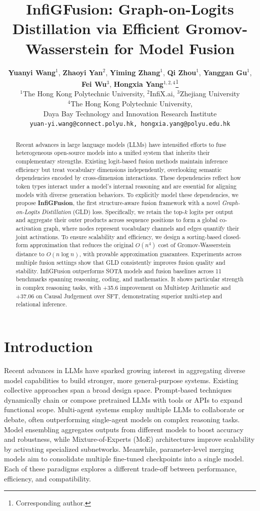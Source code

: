 \documentclass{article}
\title{InfiGFusion: Graph-on-Logits Distillation via Efficient Gromov-Wasserstein for Model Fusion}
\author{%
\textbf{Yuanyi Wang}$^{1}$,
\textbf{Zhaoyi Yan}$^{2}$,
\textbf{Yiming Zhang}$^{1}$,
\textbf{Qi Zhou}$^{1}$,
\textbf{Yanggan Gu}$^{1}$,\\
\textbf{Fei Wu}$^{3}$,
\textbf{Hongxia Yang}$^{1,2,4}$\thanks{Corresponding author.} \\
$^{1}$The Hong Kong Polytechnic University,
$^{2}$InfiX.ai, 
$^{3}$Zhejiang University \\
$^{4}$The Hong Kong Polytechnic University, \\Daya Bay Technology and Innovation Research Institute \\
\texttt{yuan-yi.wang@connect.polyu.hk, hongxia.yang@polyu.edu.hk} \\
}
\begin{document}
\maketitle


\begin{abstract}
Recent advances in large language models (LLMs) have intensified efforts to fuse heterogeneous open-source models into a unified system that inherits their complementary strengths. 
%
Existing logit-based fusion methods maintain inference efficiency but treat vocabulary dimensions independently, overlooking semantic dependencies encoded by cross-dimension interactions.
%
These dependencies reflect how token types interact under a model's internal reasoning and are essential for aligning models with diverse generation behaviors.
%
To explicitly model these dependencies, we propose \textbf{InfiGFusion}, the first structure-aware fusion framework with a novel \textit{Graph-on-Logits Distillation} (GLD) loss.
%
Specifically, we retain the top-$k$ logits per output and aggregate their outer products across sequence positions to form a global co-activation graph, where nodes represent vocabulary channels and edges quantify their joint activations.
%
To ensure scalability and efficiency, we design a sorting-based closed-form approximation that reduces the original $O(n^4)$ cost of Gromov-Wasserstein distance to $O(n \log n)$, with provable approximation guarantees. Experiments across multiple fusion settings show that GLD consistently improves fusion quality and stability.
%
InfiGFusion outperforms SOTA models and fusion baselines across 11 benchmarks spanning reasoning, coding, and mathematics. It shows particular strength in complex reasoning tasks, with +35.6 improvement on Multistep Arithmetic and +37.06 on Causal Judgement over SFT, demonstrating superior multi-step and relational inference.
%

\end{abstract}


\section{Introduction}
Recent advances in LLMs have sparked growing interest in aggregating diverse model capabilities to build stronger, more general-purpose systems. Existing collective approaches span a broad design space. Prompt-based techniques \cite{schick2023toolformer, yang2023auto} dynamically chain or compose pretrained LLMs with tools or APIs to expand functional scope. Multi-agent systems \cite{wang2024mixture, dubois2024length} employ multiple LLMs to collaborate or debate, often outperforming single-agent models on complex reasoning tasks. Model ensembling \cite{jiang2023llm, fang2024llm} aggregates outputs from different models to boost accuracy and robustness, while Mixture-of-Experts (MoE) \cite{komatsuzakisparse, du2022glam, chen2022towards} architectures improve scalability by activating specialized subnetworks. Meanwhile, parameter-level merging models \cite{yadav2023ties, matena2022merging, wortsman2022model} aim to consolidate multiple fine-tuned checkpoints into a single model. Each of these paradigms explores a different trade-off between performance, efficiency, and compatibility.
\end{document}
